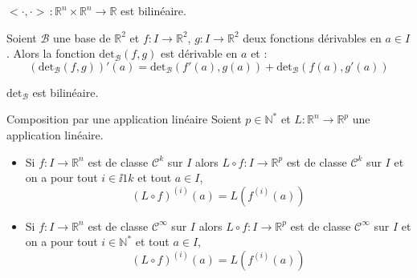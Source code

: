 \documentclass[french,11pt,twoside]{VcCours}
\begin{document}
\begin{Demonstration}{} $< \cdot , \cdot> \, : \mathbb{R}^n \times \mathbb{R}^n \rightarrow \mathbb{R}$ est bilinéaire.
\end{Demonstration}
%


\begin{Corollaire}{} Soient $\mathcal{B}$ une base de  $\mathbb{R}^2$ et $f: I \rightarrow \mathbb{R}^2$, $g : I \rightarrow \mathbb{R}^2$ deux fonctions dérivables en $a \in I$. Alors la fonction $\textrm{det}_{\mathcal{B}}(f,g)$ est dérivable en $a$ et :
$$ (\textrm{det}_{\mathcal{B}}(f,g))'(a) = \textrm{det}_{\mathcal{B}}(f'(a),g(a)) + \textrm{det}_{\mathcal{B}}(f(a),g'(a))$$
\end{Corollaire}

\begin{Demonstration}{} $\textrm{det}_{\mathcal{B}}$ est bilinéaire.
\end{Demonstration}

\begin{Proposition}{Composition par une application linéaire}
Soient $p \in \mathbb{N}^*$ et $L : \mathbb{R}^n \rightarrow \mathbb{R}^p$ une application linéaire. 
\begin{itemize}
\item Si $f : I \rightarrow \mathbb{R}^n$ est de classe $\mathcal{C}^k$ sur $I$ alors $L \circ f : I \rightarrow \mathbb{R}^p$ est de classe $\mathcal{C}^k$ sur $I$ et on a pour tout $i \in \ii{1}{k}$ et tout $a \in I$,
$$ (L \circ f)^{(i)}(a) = L (f^{(i)}(a))$$
\item  Si $f : I \rightarrow \mathbb{R}^n$ est de classe $\mathcal{C}^{\infty}$ sur $I$ alors $L \circ f : I \rightarrow \mathbb{R}^p$ est de classe $\mathcal{C}^{\infty}$ sur $I$ et on a pour tout $i \in \mathbb{N}^*$ et tout $a \in I$,
$$ (L \circ f)^{(i)}(a) = L (f^{(i)}(a))$$
\end{itemize}
\end{Proposition}
\end{document}
